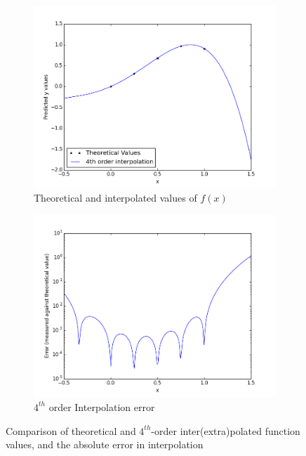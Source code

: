 \documentclass[paper=a4, fontsize=11pt]{scrartcl} %
\numberwithin{equation}{section} %
\numberwithin{figure}{section} %
\numberwithin{table}{section} %
\begin{document}
\begin{figure}
        \centering
        \begin{subfigure}{.5\textwidth}
  \centering
        \includegraphics[width=\linewidth]{q1/interpol.png}
                \caption{Theoretical and interpolated values of $f(x)$}
                \label{fig:q1_inter}
                \end{subfigure}%
\begin{subfigure}{.5\textwidth}
  \centering
        \includegraphics[width=\linewidth]{q1/error_log.png}
                \caption{$4^{th}$ order Interpolation error}
                \label{fig:q1_error}
	\end{subfigure}
            
\caption{Comparison of theoretical and $4^{th}$-order inter(extra)polated function values, and the absolute error in interpolation}
\label{fig:q1}            
\end{figure}
\end{document}
